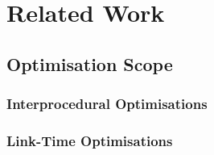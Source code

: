 \chapter{Related Work}



\section{Optimisation Scope}
\subsection{Interprocedural Optimisations}
\subsection{Link-Time Optimisations}

